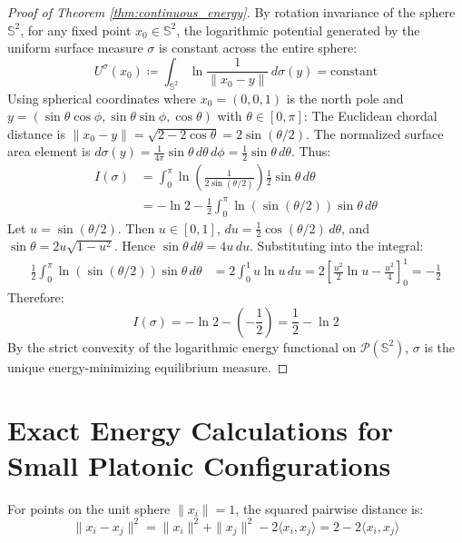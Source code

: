 \documentclass[11pt,a4paper]{article}
\theoremstyle{definition}
\begin{document}
\begin{proof}[Proof of Theorem \ref{thm:continuous_energy}]
By rotation invariance of the sphere $\mathbb{S}^2$, for any fixed point $x_0 \in \mathbb{S}^2$, the logarithmic potential generated by the uniform surface measure $\sigma$ is constant across the entire sphere:
\[ U^\sigma(x_0) \coloneqq \int_{\mathbb{S}^2} \ln \frac{1}{\|x_0 - y\|} \, d\sigma(y) = \text{constant} \]
Using spherical coordinates where $x_0 = (0, 0, 1)$ is the north pole and $y = (\sin\theta \cos\phi, \sin\theta \sin\phi, \cos\theta)$ with $\theta \in [0, \pi]$:
The Euclidean chordal distance is $\|x_0 - y\| = \sqrt{2 - 2\cos\theta} = 2 \sin(\theta/2)$.
The normalized surface area element is $d\sigma(y) = \frac{1}{4\pi} \sin\theta \, d\theta \, d\phi = \frac{1}{2} \sin\theta \, d\theta$.
Thus:
\begin{align*}
I(\sigma) &= \int_0^\pi \ln \left( \frac{1}{2 \sin(\theta/2)} \right) \frac{1}{2} \sin\theta \, d\theta \\
&= -\ln 2 - \frac{1}{2} \int_0^\pi \ln\left(\sin(\theta/2)\right) \sin\theta \, d\theta
\end{align*}
Let $u = \sin(\theta/2)$. Then $u \in [0, 1]$, $du = \frac{1}{2} \cos(\theta/2) \, d\theta$, and $\sin\theta = 2 u \sqrt{1 - u^2}$.
Hence $\sin\theta \, d\theta = 4 u \, du$.
Substituting into the integral:
\begin{align*}
\frac{1}{2} \int_0^\pi \ln\left(\sin(\theta/2)\right) \sin\theta \, d\theta &= 2 \int_0^1 u \ln u \, du = 2 \left[ \frac{u^2}{2} \ln u - \frac{u^2}{4} \right]_0^1 = -\frac{1}{2}
\end{align*}
Therefore:
\[ I(\sigma) = -\ln 2 - \left( -\frac{1}{2} \right) = \frac{1}{2} - \ln 2 \]
By the strict convexity of the logarithmic energy functional on $\mathcal{P}(\mathbb{S}^2)$, $\sigma$ is the unique energy-minimizing equilibrium measure.
\end{proof}

\section{Exact Energy Calculations for Small Platonic Configurations}

For points on the unit sphere $\|x_i\| = 1$, the squared pairwise distance is:
\begin{equation}\label{eq:chordal_dist}
\|x_i - x_j\|^2 = \|x_i\|^2 + \|x_j\|^2 - 2 \langle x_i, x_j \rangle = 2 - 2 \langle x_i, x_j \rangle
\end{equation}
\end{document}
